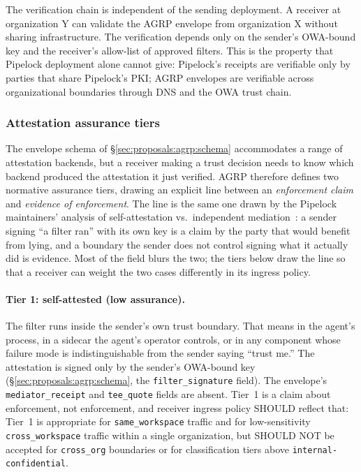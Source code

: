 The verification chain is independent of the sending
deployment. A receiver at organization Y can validate
the AGRP envelope from organization X without sharing
infrastructure. The verification depends only on the
sender's OWA-bound key and the receiver's allow-list of
approved filters. This is the property that Pipelock
deployment alone cannot give: Pipelock's receipts are
verifiable only by parties that share Pipelock's PKI;
AGRP envelopes are verifiable across organizational
boundaries through DNS and the OWA trust chain.

\subsubsection{Attestation assurance tiers}
\label{sec:proposals:agrp:tiers}

The envelope schema of
\S\ref{sec:proposals:agrp:schema} accommodates a
range of attestation backends, but a receiver making a
trust decision needs to know which backend produced the
attestation it just verified. AGRP therefore defines
two normative assurance tiers, drawing an explicit line
between an \emph{enforcement claim} and \emph{evidence of
enforcement}. The line is the same one drawn by the
Pipelock maintainers' analysis of self-attestation vs.\
independent
mediation~\cite{pipelab_independent_attestation}: a
sender signing ``a filter ran'' with its own key is a
claim by the party that would benefit from lying, and a
boundary the sender does not control signing what it
actually did is evidence. Most of the field blurs the
two; the tiers below draw the line so that a receiver
can weight the two cases differently in its ingress
policy.

\paragraph{Tier 1: self-attested (low assurance).}
The filter runs inside the sender's own trust boundary.
That means in the agent's process, in a sidecar the
agent's operator controls, or in any component whose
failure mode is indistinguishable from the sender saying
``trust me.'' The attestation is signed only by the
sender's OWA-bound key
(\S\ref{sec:proposals:agrp:schema}, the
\texttt{filter\_signature} field). The envelope's
\texttt{mediator\_receipt} and \texttt{tee\_quote}
fields are absent. Tier~1 is a claim about enforcement,
not enforcement, and receiver ingress policy SHOULD
reflect that: Tier~1 is appropriate for
\texttt{same\_workspace} traffic and for low-sensitivity
\texttt{cross\_workspace} traffic within a single
organization, but SHOULD NOT be accepted for
\texttt{cross\_org} boundaries or for classification
tiers above \texttt{internal-confidential}.

